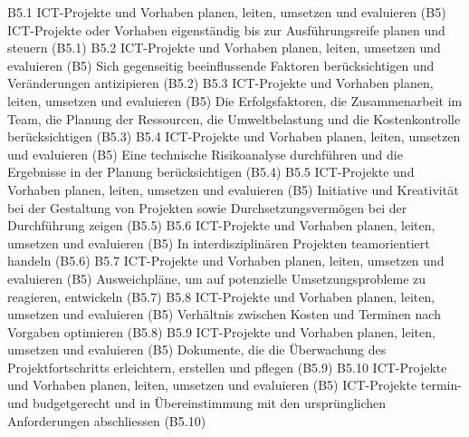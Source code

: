 \templateCard
  {B5.1}
  {ICT-Projekte und Vorhaben planen, leiten, umsetzen und evaluieren (B5)}
  {ICT-Projekte oder Vorhaben eigenständig bis zur Ausführungsreife planen und steuern (B5.1)}
\templateCard
  {B5.2}
  {ICT-Projekte und Vorhaben planen, leiten, umsetzen und evaluieren (B5)}
  {Sich gegenseitig beeinflussende Faktoren berücksichtigen und Veränderungen antizipieren (B5.2)}
\templateCard
  {B5.3}
  {ICT-Projekte und Vorhaben planen, leiten, umsetzen und evaluieren (B5)}
  {Die Erfolgsfaktoren, die Zusammenarbeit im Team, die Planung der Ressourcen, die Umweltbelastung und die Kostenkontrolle berücksichtigen (B5.3)}
\templateCard
  {B5.4}
  {ICT-Projekte und Vorhaben planen, leiten, umsetzen und evaluieren (B5)}
  {Eine technische Risikoanalyse durchführen und die Ergebnisse in der Planung berücksichtigen (B5.4)}
\templateCard
  {B5.5}
  {ICT-Projekte und Vorhaben planen, leiten, umsetzen und evaluieren (B5)}
  {Initiative und Kreativität bei der Gestaltung von Projekten sowie Durchsetzungsvermögen bei der Durchführung zeigen (B5.5)}
\templateCard
  {B5.6}
  {ICT-Projekte und Vorhaben planen, leiten, umsetzen und evaluieren (B5)}
  {In interdisziplinären Projekten teamorientiert handeln (B5.6)}
\templateCard
  {B5.7}
  {ICT-Projekte und Vorhaben planen, leiten, umsetzen und evaluieren (B5)}
  {Ausweichpläne, um auf potenzielle Umsetzungsprobleme zu reagieren, entwickeln (B5.7)}
\templateCard
  {B5.8}
  {ICT-Projekte und Vorhaben planen, leiten, umsetzen und evaluieren (B5)}
  {Verhältnis zwischen Kosten und Terminen nach Vorgaben optimieren (B5.8)}
\templateCard
  {B5.9}
  {ICT-Projekte und Vorhaben planen, leiten, umsetzen und evaluieren (B5)}
  {Dokumente, die die Überwachung des Projektfortschritts erleichtern, erstellen und pflegen (B5.9)}
\templateCard
  {B5.10}
  {ICT-Projekte und Vorhaben planen, leiten, umsetzen und evaluieren (B5)}
  {ICT-Projekte termin- und budgetgerecht und in Übereinstimmung mit den ursprünglichen Anforderungen abschliessen (B5.10)}
